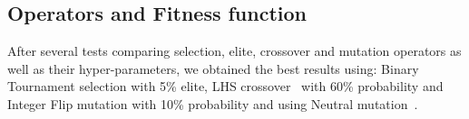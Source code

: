 \documentclass{llncs}
\begin{document}


\subsection{Operators and Fitness function}

After several tests comparing selection, elite, crossover and mutation operators as well as their hyper-parameters, we obtained the best results using: Binary Tournament selection\cite{binarytour} with 5\% elite, LHS crossover~\cite{harper_blair_2005} with 60\% probability and Integer Flip mutation with 10\% probability and using Neutral mutation~\cite{oesch_maringer_2014}.
\end{document}
